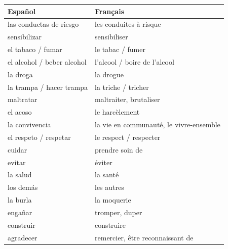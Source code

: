 \documentclass[11pt]{article}
\begin{document}
\begin{definition}
\begin{center}
\begin{tabularx}{\linewidth}{|X|X|}
\hline
\rowcolor{popblueL} \textbf{Español} & \textbf{Français} \\
\hline
las conductas de riesgo & les conduites à risque \\
\hline
sensibilizar & sensibiliser \\
\hline
el tabaco / fumar & le tabac / fumer \\
\hline
el alcohol / beber alcohol & l'alcool / boire de l'alcool \\
\hline
la droga & la drogue \\
\hline
la trampa / hacer trampa & la triche / tricher \\
\hline
maltratar & maltraiter, brutaliser \\
\hline
el acoso & le harcèlement \\
\hline
la convivencia & la vie en communauté, le vivre-ensemble \\
\hline
el respeto / respetar & le respect / respecter \\
\hline
cuidar & prendre soin de \\
\hline
evitar & éviter \\
\hline
la salud & la santé \\
\hline
los demás & les autres \\
\hline
la burla & la moquerie \\
\hline
engañar & tromper, duper \\
\hline
construir & construire \\
\hline
agradecer & remercier, être reconnaissant de \\
\hline
\end{tabularx}
\end{center}
\end{definition}
\end{document}
